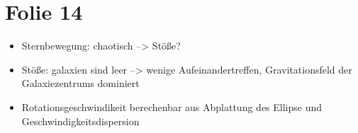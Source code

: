 \section{Folie 14}

\begin{itemize}
\item Sternbewegung: chaotisch --> Stöße?
\item Stöße: galaxien sind leer --> wenige Aufeinandertreffen, Gravitationsfeld der Galaxiezentrums dominiert
\item Rotationsgeschwindikeit berechenbar aus Abplattung des Ellipse und Geschwindigkeitsdispersion
\end{itemize}

